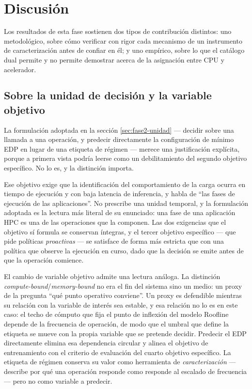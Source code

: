 \documentclass[12pt,oneside,spanish]{book}
\begin{document}

\chapter{Discusión}

Los resultados de esta fase sostienen dos tipos de contribución distintos: uno metodológico, sobre cómo verificar con rigor cada mecanismo de un instrumento de caracterización antes de confiar en él; y uno empírico, sobre lo que el catálogo dual permite y no permite demostrar acerca de la asignación entre CPU y acelerador.

\section{Sobre la unidad de decisión y la variable objetivo}
\label{sec:discusion-granularidad}

La formulación adoptada en la sección \ref{sec:fase2-unidad} --- decidir sobre una llamada a una operación, y predecir directamente la configuración de mínimo EDP en lugar de una etiqueta de régimen --- merece una justificación explícita, porque a primera vista podría leerse como un debilitamiento del segundo objetivo específico. No lo es, y la distinción importa.

Ese objetivo exige que la identificación del comportamiento de la carga ocurra en tiempo de ejecución y con baja latencia de inferencia, y habla de ``las fases de ejecución de las aplicaciones''. No prescribe una unidad temporal, y la formulación adoptada es la lectura más literal de su enunciado: una fase de una aplicación HPC es una de las operaciones que la componen. Las dos exigencias que el objetivo sí formula se conservan íntegras, y el tercer objetivo específico --- que pide políticas \textit{proactivas} --- se satisface de forma más estricta que con una política que observe la ejecución en curso, dado que la decisión se emite antes de que la operación comience.

El cambio de variable objetivo admite una lectura análoga. La distinción \textit{compute-bound}/\textit{memory-bound} no era el fin del sistema sino un medio: un proxy de la pregunta ``qué punto operativo conviene''. Un proxy es defendible mientras su relación con la variable de interés sea estable, y esa relación no lo es en este caso: el techo de cómputo que fija el punto de inflexión del modelo Roofline depende de la frecuencia de operación, de modo que el umbral que define la etiqueta se mueve con la propia variable que se pretende decidir. Predecir el EDP directamente elimina esa dependencia circular y alinea el objetivo de entrenamiento con el criterio de evaluación del cuarto objetivo específico. La etiqueta de régimen conserva su valor como herramienta de \textit{caracterización} --- describe por qué una operación responde como responde al escalado de frecuencia --- pero no como variable a predecir.
\end{document}

